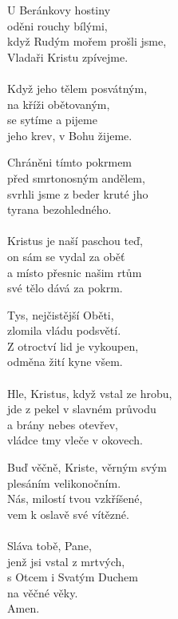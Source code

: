 \begin{translatioMulticol}{4}
U Beránkovy hostiny\\
oděni rouchy bílými,\\
když Rudým mořem prošli jsme,\\
Vladaři Kristu zpívejme.\\
\\
Když jeho tělem posvátným,\\
na kříži obětovaným,\\
se sytíme a pijeme\\
jeho krev, v Bohu žijeme.\columnbreak

Chráněni tímto pokrmem\\
před smrtonosným andělem,\\
svrhli jsme z beder kruté jho\\
tyrana bezohledného.\\
\\
Kristus je naší paschou teď,\\
on sám se vydal za oběť\\
a místo přesnic našim rtům\\
své tělo dává za pokrm.\columnbreak

Tys, nejčistější Oběti,\\
zlomila vládu podsvětí.\\
Z otroctví lid je vykoupen,\\
odměna žití kyne všem.\\
\\
Hle, Kristus, když vstal ze hrobu,\\
jde z pekel v slavném průvodu\\
a brány nebes otevřev,\\
vládce tmy vleče v okovech.\columnbreak

Buď věčně, Kriste, věrným svým\\
plesáním velikonočním.\\
Nás, milostí tvou vzkříšené,\\
vem k oslavě své vítězné. \\
\\
Sláva tobě, Pane,\\
jenž jsi vstal z mrtvých,\\
s Otcem i Svatým Duchem\\
na věčné věky.\\
Amen.
\end{translatioMulticol}
